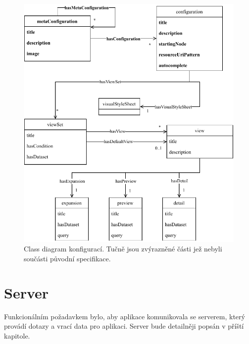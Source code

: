 \begin{figure}
    \centering
    \includegraphics{media/configuration-class-diagram.pdf}
    \caption{Class diagram konfigurací. Tučně jsou zvýrazněné části jež nebyli součásti původní specifikace.}
    \label{fig:configuration-class-diagram}
\end{figure}

\newpage





\section{Server}
Funkcionálním požadavkem bylo, aby aplikace komunikovala se serverem, který provádí dotazy a vrací data pro aplikaci. Server bude detailněji popsán v příští kapitole.


